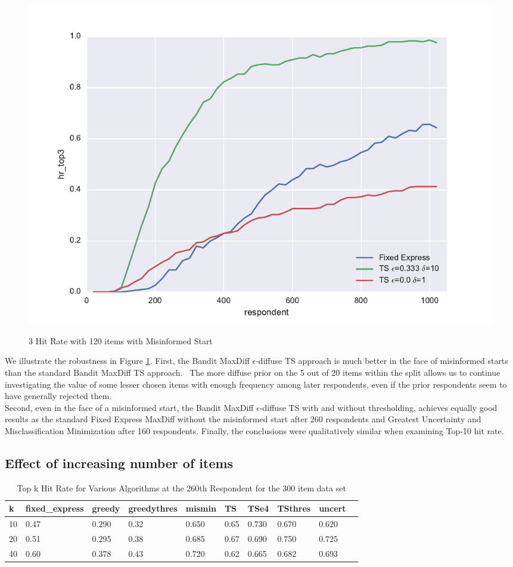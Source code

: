 \documentclass[nonblindrev]{informs3}
\begin{document}
\begin{figure}
\caption{3 Hit Rate with 120 items with Misinformed Start}
\includegraphics[width=1\textwidth]{plots/3hitrate120show3mis.pdf}
\label{fig:3hitmis}
\end{figure}
We illustrate the robustness in Figure \ref{fig:3hitmis}. First, the Bandit MaxDiff $\epsilon$-diffuse TS approach is much better in the face of misinformed starts than the standard Bandit MaxDiff TS approach.  The more diffuse prior on the 5 out of 20 items within the split allows us to continue investigating the value of some lesser chosen items with enough frequency among later respondents, even if the prior respondents seem to have generally rejected them.\\
Second, even in the face of a misinformed start, the Bandit MaxDiff $\epsilon$-diffuse TS with and without thresholding, achieves equally good results as the standard Fixed Express MaxDiff without the misinformed start after 260 respondents and Greatest Uncertainty and Misclassification Minimization after 160 respondents. Finally, the conclusions were qualitatively similar when examining Top-10 hit rate.\\
\subsection{Effect of increasing number of items}
\begin{table}
\begin{center}
\begin{tabular}{llllllllll}
\hline   k &  fixed\_express &  greedy &  greedythres &  mismin &    TS &  TSe4 &  TSthres &  uncert \\ \hline    10 &           0.47 &   0.290 &         0.32 &   0.650 & 0.65 & 0.730 &    0.670 &   0.620 \\  20 &           0.51 &   0.295 &         0.38 &   0.685 & 0.67 & 0.690 &    0.750 &   0.725 \\ 40 &           0.60 &   0.378 &         0.43 &   0.720 & 0.62 & 0.665 &    0.682 &   0.693 \end{tabular}
\end{center}
\caption{Top k Hit Rate for Various Algorithms at the 260th Respondent for the 300 item data set}
\label{table:300at260}
\end{table}
\end{document}
